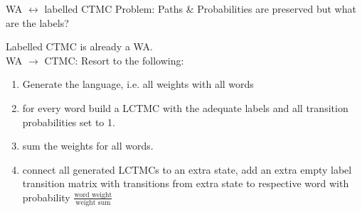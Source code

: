 \documentclass[rgb, pdf]{beamer}
\begin{document}
\begin{frame}[allowframebreaks]{WA $\leftrightarrow$ labelled CTMC}
         Problem: Paths \& Probabilities are preserved but what are the labels?
         \framebreak
         
         Labelled CTMC is already a WA.\\
         
         WA $\rightarrow$ CTMC: Resort to the following:
            \begin{enumerate}
             \item Generate the language, i.e. all weights with all words
             \item for every word build a LCTMC with the adequate labels and all transition probabilities set to 1.
             \item sum the weights for all words.
             \item connect all generated LCTMCs to an extra state, add an extra empty label transition matrix with transitions from extra state to respective word with probability $\frac{\text{word weight}}{\text{weight sum}}$
            \end{enumerate}

        \end{frame}
\end{document}
